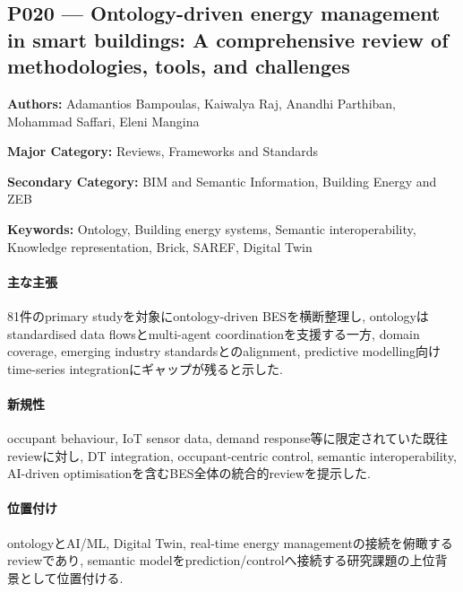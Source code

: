 \subsection{P020 --- Ontology-driven energy management in smart buildings: A comprehensive review of methodologies, tools, and challenges}
\label{paper:P020}
\textbf{Authors:} Adamantios Bampoulas, Kaiwalya Raj, Anandhi Parthiban, Mohammad Saffari, Eleni Mangina\par
\textbf{Major Category:} Reviews, Frameworks and Standards\par
\textbf{Secondary Category:} BIM and Semantic Information, Building Energy and ZEB\par
\textbf{Keywords:} Ontology, Building energy systems, Semantic interoperability, Knowledge representation, Brick, SAREF, Digital Twin\par
\paragraph{主な主張}
81件のprimary studyを対象にontology-driven BESを横断整理し, ontologyはstandardised data flowsとmulti-agent coordinationを支援する一方, domain coverage, emerging industry standardsとのalignment, predictive modelling向けtime-series integrationにギャップが残ると示した. \cite{Bampoulas:2026OntologyEnergyReview}
\paragraph{新規性}
occupant behaviour, IoT sensor data, demand response等に限定されていた既往reviewに対し, DT integration, occupant-centric control, semantic interoperability, AI-driven optimisationを含むBES全体の統合的reviewを提示した.
\paragraph{位置付け}
ontologyとAI/ML, Digital Twin, real-time energy managementの接続を俯瞰するreviewであり, semantic modelをprediction/controlへ接続する研究課題の上位背景として位置付ける.
